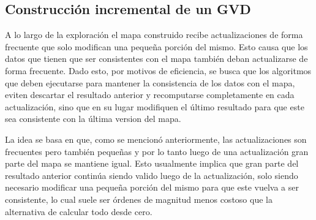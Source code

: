 \subsection{Construcción incremental de un GVD}\label{subsec:constGVDInc}



A lo largo de la exploración el mapa construido recibe actualizaciones de forma frecuente que solo modifican una pequeña porción del mismo. Esto causa que los datos que tienen que ser consistentes con el mapa también deban actualizarse de forma frecuente. Dado esto, por motivos de eficiencia, se busca que los algoritmos que deben ejecutarse para mantener la consistencia de los datos con el mapa, eviten descartar el resultado anterior y recomputarse completamente en cada actualización, sino que en su lugar modifiquen el último resultado para que este sea consistente con la última version del mapa. 

La idea se basa en que, como se mencionó anteriormente, las actualizaciones son frecuentes pero también pequeñas y por lo tanto luego de una actualización gran parte del mapa se mantiene igual. Esto usualmente implica que gran parte del resultado anterior continúa siendo valido luego de la actualización, solo siendo necesario modificar una pequeña porción del mismo para que este vuelva a ser consistente, lo cual suele ser órdenes de magnitud menos costoso que la alternativa de calcular todo desde cero. 

